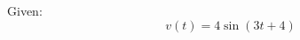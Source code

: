 \begin{questions}
\question Given:
\begin{equation*}
	v(t) = 4\sin(3t+4)
\end{equation*}

\end{questions}